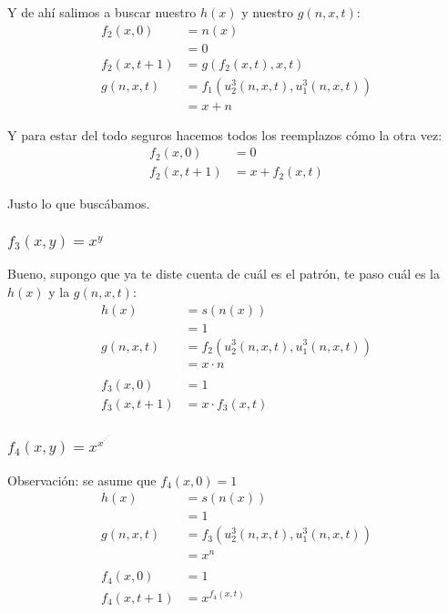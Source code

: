 \documentclass[fleqn, 11pt]{article}
\begin{document}
Y de ahí salimos a buscar nuestro $h(x)$ y nuestro $g(n, x, t)$:
\begin{align*}
	f_2(x, 0)     &= n(x) \\
	              &= 0 \\
	f_2(x, t + 1) &= g(f_2(x, t), x, t) \\
	g(n, x, t)    &= f_1(u^3_2(n, x, t), u^3_1(n, x, t)) \\
	              &= x + n
\end{align*}

Y para estar del todo seguros hacemos todos los reemplazos cómo la otra vez:
\begin{align*}
	f_2(x, 0)     &= 0 \\
	f_2(x, t + 1) &= x + f_2(x, t)
\end{align*}

Justo lo que buscábamos.

\subsubsection{$f_3(x, y) = x^y$}

Bueno, supongo que ya te diste cuenta de cuál es el patrón, te paso cuál es la
$h(x)$ y la $g(n, x, t)$:
\begin{align*}
	h(x)          &= s(n(x)) \\
	&= 1 \\
	g(n, x, t)    &= f_2(u^3_2(n, x, t), u^3_1(n, x, t)) \\
	&= x \cdot n \\
	\\
	f_3(x, 0)     &= 1 \\
	f_3(x, t + 1) &= x \cdot f_3(x, t)
\end{align*}

\subsubsection{$f_4(x, y) = x^{x^{\cdot^{\cdot^{\cdot^{^{x}}}}}}$}

Observación: se asume que $f_4(x, 0) = 1$
\begin{align*}
	h(x)       &= s(n(x)) \\
	&= 1 \\
	g(n, x, t) &= f_3(u^3_2(n, x, t), u^3_1(n, x, t)) \\
	&= x^n \\
	\\
	f_4(x, 0)     &= 1 \\
	f_4(x, t + 1) &= x^{f_4(x, t)}
\end{align*}
\end{document}
